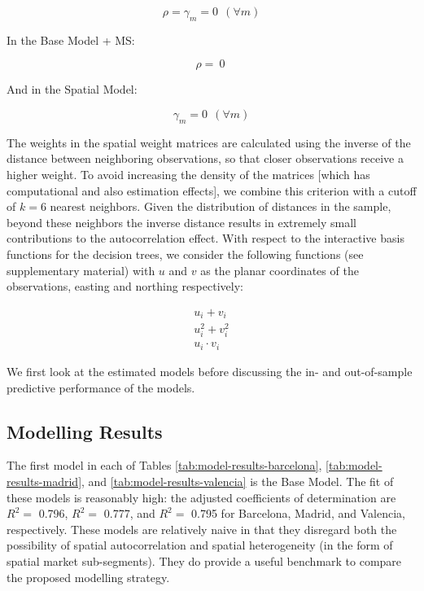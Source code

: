 \documentclass[Royal,times,sageh]{sagej}
\begin{document}
\begin{equation}
\rho = \gamma_{m} = 0\ \ (\forall m)
\label{eq:restrictions-base}
\end{equation}

In the Base Model + MS:

\begin{equation}
\rho = \ 0\ 
\label{eq:restrictions-base}
\end{equation}

And in the Spatial Model:

\begin{equation}
\gamma_{m} = 0\ \ (\forall m)
\label{eq:restrictions-base}
\end{equation}

The weights in the spatial weight matrices are calculated using the
inverse of the distance between neighboring observations, so that closer
observations receive a higher weight. To avoid increasing the density of
the matrices {[}which has computational and also estimation effects{]},
we combine this criterion with a cutoff of \(k=6\) nearest neighbors.
Given the distribution of distances in the sample, beyond these
neighbors the inverse distance results in extremely small contributions
to the autocorrelation effect. With respect to the interactive basis
functions for the decision trees, we consider the following functions
(see supplementary material) with \(u\) and \(v\) as the planar
coordinates of the observations, easting and northing respectively:

\begin{equation}
\begin{array}{ccc}
u_i + v_i \\ [5pt]
u_i^2 + v_i^2 \\ [5pt]
u_i \cdot v_i
\end{array}
\label{eq:ibf1}
\end{equation}

We first look at the estimated models before discussing the in- and
out-of-sample predictive performance of the models.

\hypertarget{modelling-results}{%
\subsection{Modelling Results}\label{modelling-results}}

The first model in each of Tables \ref{tab:model-results-barcelona},
\ref{tab:model-results-madrid}, and \ref{tab:model-results-valencia} is
the Base Model. The fit of these models is reasonably high: the adjusted
coefficients of determination are \(R^2=\) 0.796, \(R^2=\) 0.777, and
\(R^2=\) 0.795 for Barcelona, Madrid, and Valencia, respectively. These
models are relatively naive in that they disregard both the possibility
of spatial autocorrelation and spatial heterogeneity (in the form of
spatial market sub-segments). They do provide a useful benchmark to
compare the proposed modelling strategy.
\end{document}
